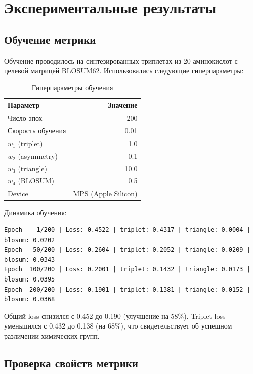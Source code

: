 \documentclass[12pt]{article}
\begin{document}
\section{Экспериментальные результаты}

\subsection{Обучение метрики}

Обучение проводилось на синтезированных триплетах из 20 аминокислот с целевой матрицей BLOSUM62. Использовались следующие гиперпараметры:

\begin{table}[h]
\centering
\caption{Гиперпараметры обучения}
\label{tab:hyperparams}
\begin{tabular}{lr}
\toprule
\textbf{Параметр} & \textbf{Значение} \\
\midrule
Число эпох & 200 \\
Скорость обучения & 0.01 \\
$w_1$ (triplet) & 1.0 \\
$w_2$ (asymmetry) & 0.1 \\
$w_3$ (triangle) & 10.0 \\
$w_4$ (BLOSUM) & 0.5 \\
Device & MPS (Apple Silicon) \\
\bottomrule
\end{tabular}
\end{table}

Динамика обучения:

\begin{verbatim}
Epoch    1/200 | Loss: 0.4522 | triplet: 0.4317 | triangle: 0.0004 | blosum: 0.0202
Epoch   50/200 | Loss: 0.2604 | triplet: 0.2052 | triangle: 0.0209 | blosum: 0.0343
Epoch  100/200 | Loss: 0.2001 | triplet: 0.1432 | triangle: 0.0173 | blosum: 0.0395
Epoch  200/200 | Loss: 0.1901 | triplet: 0.1381 | triangle: 0.0152 | blosum: 0.0368
\end{verbatim}

Общий loss снизился с 0.452 до 0.190 (улучшение на 58\%). Triplet loss уменьшился с 0.432 до 0.138 (на 68\%), что свидетельствует об успешном различении химических групп.

\subsection{Проверка свойств метрики}
\end{document}
